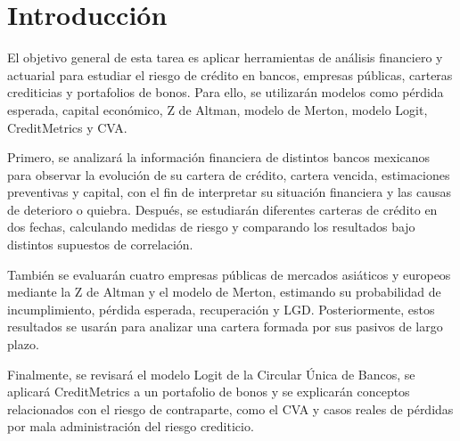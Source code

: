 \section*{Introducción}
El objetivo general de esta tarea es aplicar herramientas de análisis financiero y actuarial para estudiar el riesgo de crédito en bancos, empresas públicas, carteras crediticias y portafolios de bonos. Para ello, se utilizarán modelos como pérdida esperada, capital económico, Z de Altman, modelo de Merton, modelo Logit, CreditMetrics y CVA.

Primero, se analizará la información financiera de distintos bancos mexicanos para observar la evolución de su cartera de crédito, cartera vencida, estimaciones preventivas y capital, con el fin de interpretar su situación financiera y las causas de deterioro o quiebra. Después, se estudiarán diferentes carteras de crédito en dos fechas, calculando medidas de riesgo y comparando los resultados bajo distintos supuestos de correlación.

También se evaluarán cuatro empresas públicas de mercados asiáticos y europeos mediante la Z de Altman y el modelo de Merton, estimando su probabilidad de incumplimiento, pérdida esperada, recuperación y LGD. Posteriormente, estos resultados se usarán para analizar una cartera formada por sus pasivos de largo plazo.

Finalmente, se revisará el modelo Logit de la Circular Única de Bancos, se aplicará CreditMetrics a un portafolio de bonos y se explicarán conceptos relacionados con el riesgo de contraparte, como el CVA y casos reales de pérdidas por mala administración del riesgo crediticio.
